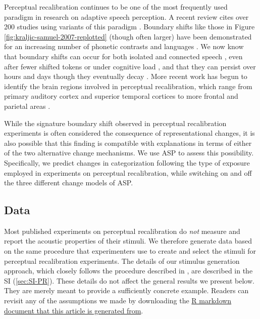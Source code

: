 \documentclass[
  11pt,
  man,floatsintext]{apa6}
\begin{document}
Perceptual recalibration continues to be one of the most frequently used paradigm in research on adaptive speech perception. A recent review cites over 200 studies using variants of this paradigm \autocite{theodore2021}. Boundary shifts like those in Figure \ref{fig:kraljic-samuel-2007-replotted} (though often larger) have been demonstrated for an increasing number of phonetic contrasts and languages \autocites[e.g.,][]{hanulikova-weber2012,kraljic-samuel2005,kraljic-samuel2006,reinisch2013,sumner2011,vroomen2007}. We now know that boundary shifts can occur for both isolated and connected speech \autocites[e.g.,][]{eisner-mcqueen2005,reinisch-holt2013}, even after fewer shifted tokens \autocites[e.g., as few as four,][]{liu-jaeger2018,liu-jaeger2019} or under cognitive load \autocites{baart-vroomen2010,zhang-samuel2014}[but see][]{samuel2016}, and that they can persist over hours and days \autocite{eisner-mcqueen2006,vroomen-baart2009,saltzman-myers2021} though they eventually decay \autocite{samuel2021,zheng-samuel2023}. More recent work has begun to identify the brain regions involved in perceptual recalibration, which range from primary auditory cortex and superior temporal cortices to more frontal and parietal areas \autocites{bonte2017,kilianhutten2011,myers-mesite2014,ullas2020,luthra2020a}[for review, see][]{guediche2014}.

While the signature boundary shift observed in perceptual recalibration experiments is often considered the consequence of representational changes, it is also possible that this finding is compatible with explanations in terms of either of the two alternative change mechanisms. We use ASP to assess this possibility. Specifically, we predict changes in categorization following the type of exposure employed in experiments on perceptual recalibration, while switching on and off the three different change models of ASP.

\hypertarget{data}{%
\subsection{Data}\label{data}}

Most published experiments on perceptual recalibration do \emph{not} measure and report the acoustic properties of their stimuli. We therefore generate data based on the same procedure that experimenters use to create and select the stimuli for perceptual recalibration experiments. The details of our stimulus generation approach, which closely follows the procedure described in \textcite{kraljic-samuel2006}, are described in the SI (\ref{sec:SI-PR}). These details do not affect the general results we present below. They are merely meant to provide a sufficiently concrete example. Readers can revisit any of the assumptions we made by downloading the \href{https://osf.io/q7gjp/}{R markdown document that this article is generated from}.
\end{document}
